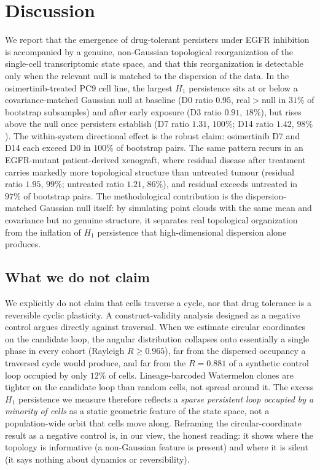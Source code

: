 \section{Discussion}

We report that the emergence of drug-tolerant persisters under EGFR
inhibition is accompanied by a genuine, non-Gaussian topological
reorganization of the single-cell transcriptomic state space, and that
this reorganization is detectable only when the relevant null is matched
to the dispersion of the data. In the osimertinib-treated PC9 cell line,
the largest $H_1$ persistence sits at or below a covariance-matched
Gaussian null at baseline (D0 ratio $0.95$, real$>$null in $31\%$ of
bootstrap subsamples) and after early exposure (D3 ratio $0.91$, $18\%$),
but rises above the null once persisters establish (D7 ratio $1.31$,
$100\%$; D14 ratio $1.42$, $98\%$). The within-system directional effect
is the robust claim: osimertinib D7 and D14 each exceed D0 in $100\%$ of
bootstrap pairs. The same pattern recurs in an EGFR-mutant
patient-derived xenograft, where residual disease after treatment carries
markedly more topological structure than untreated tumour (residual ratio
$1.95$, $99\%$; untreated ratio $1.21$, $86\%$), and residual exceeds
untreated in $97\%$ of bootstrap pairs. The methodological contribution is
the dispersion-matched Gaussian null itself: by simulating point clouds
with the same mean and covariance but no genuine structure, it separates
real topological organization from the inflation of $H_1$ persistence that
high-dimensional dispersion alone produces.

\subsection*{What we do not claim}

We explicitly do not claim that cells traverse a cycle, nor that drug
tolerance is a reversible cyclic plasticity. A construct-validity analysis
designed as a negative control argues directly against traversal. When we
estimate circular coordinates on the candidate loop, the angular
distribution collapses onto essentially a single phase in every cohort
(Rayleigh $R \ge 0.965$), far from the dispersed occupancy a traversed
cycle would produce, and far from the $R = 0.881$ of a synthetic control
loop occupied by only $12\%$ of cells. Lineage-barcoded Watermelon clones
are tighter on the candidate loop than random cells, not spread around it.
The excess $H_1$ persistence we measure therefore reflects a
\emph{sparse persistent loop occupied by a minority of cells} as a static
geometric feature of the state space, not a population-wide orbit that
cells move along. Reframing the circular-coordinate result as a negative
control is, in our view, the honest reading: it shows where the topology
is informative (a non-Gaussian feature is present) and where it is silent
(it says nothing about dynamics or reversibility).

